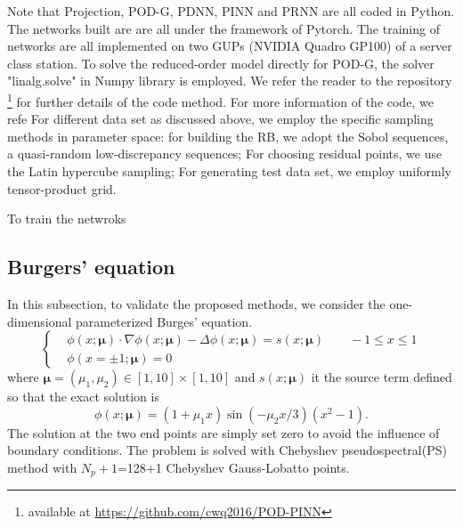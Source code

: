 \documentclass[preprint, 10pt]{elsarticle}
\begin{document}
Note that Projection, POD-G, PDNN, PINN and PRNN are all coded in Python. The networks built are are all under the framework of Pytorch. The training of networks are all  implemented on two GUPs (NVIDIA Quadro GP100) of a server class station. To solve the reduced-order model directly for POD-G, the solver "linalg.solve" in  Numpy library is employed. We refer the reader to the repository \footnote{available at \url{https://github.com/cwq2016/POD-PINN}} for further details of the code method. For more information of the code, we refe For different data set as discussed above, we employ the specific sampling methods in parameter space: for building the RB, we adopt the Sobol sequences, a quasi-random low-discrepancy sequences; For choosing residual points, we use the Latin hypercube sampling; For generating test data set, we employ uniformly tensor-product grid.

To train the netwroks


\subsection{Burgers' equation}
In this subsection, to validate the proposed methods, we consider the one-dimensional parameterized Burges' equation.
\begin{equation}
\left\{
\begin{aligned}
	 &\phi(x;\pmb{\mu}) \cdot \nabla \phi(x;\pmb{\mu}) -  \Delta \phi(x;\pmb{\mu})= s(x;\pmb{\mu})  \qquad -1 \le x \le 1\\
	 &\phi\left ( x= \pm1; \pmb {\mu} \right ) = 0
\end{aligned}\right.
\end{equation}
where $\pmb{\mu} =(\mu_1, \mu_2) \in [1,10] \times [1,10]$ and $s(x;\pmb{\mu})$ it the source term defined so that the exact solution is
\begin{equation}
	\phi(x; \pmb{\mu}) = (1+\mu_1 x)\sin(-\mu_2 x/3) (x^2-1) .
\end{equation}
The solution at the two end points are simply set zero to avoid the influence of boundary conditions. The problem is solved with Chebyshev pseudospectral(PS) method with $N_p+1$=128+1 Chebyshev Gauss-Lobatto points.
\end{document}
